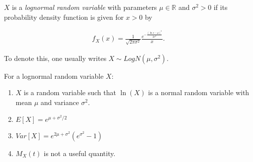 \documentclass[12pt]{article}
\def\R{\mathbb{R}}
\begin{document}
$X$ is a \emph{lognormal random variable} with parameters $\mu\in\R$ and $\sigma^2>0$ if its probability density function is given for $x>0$ by

\begin{align*}
f_X(x) = \frac{1}{\sqrt{2 \pi \sigma^2}} \frac{e^{-\frac{(\ln{x}-\mu)^2}{2 \sigma^2}}}{x}.
\end{align*}

To denote this, one usually writes $X\sim LogN(\mu,\sigma^2)$.


For a lognormal random variable $X$:
\begin{enumerate}
\item $X$ is a random variable such that $\ln(X)$ is a normal random variable with mean $\mu$ and variance $\sigma^2$.
\item $E[X] = e^{\mu + \sigma^2/2}$
\item $Var[X] = e^{2\mu + \sigma^2}(e^{\sigma^2} - 1)$
\item $M_X(t)$ is not a useful quantity.

\end{enumerate}
\end{document}
